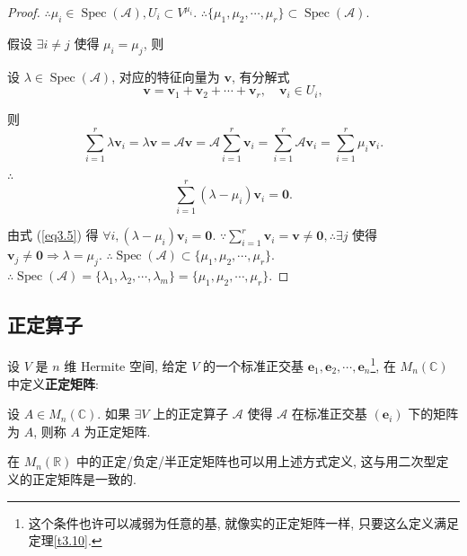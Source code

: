 \documentclass{ctexart}
\begin{document}
\begin{proof}
    $\therefore\mu_i\in\operatorname{Spec}(\mathcal{A}),U_i\subset V^{\mu_i}$. $\therefore\{\mu_1,\mu_2,\cdots,\mu_r\}\subset\operatorname{Spec}(\mathcal{A})$.

    假设 $\exists i\neq j$ 使得 $\mu_i=\mu_j$, 则 

    设 $\lambda\in\operatorname{Spec}(\mathcal{A})$, 对应的特征向量为 $\boldsymbol{v}$, 有分解式
    \[\boldsymbol{v}=\boldsymbol{v}_1+\boldsymbol{v}_2+\cdots+\boldsymbol{v}_r,\quad\boldsymbol{v}_i\in U_i,\]

    则
    \[\sum\limits_{i=1}^r\lambda\boldsymbol{v}_i=\lambda\boldsymbol{v}=\mathcal{A}\boldsymbol{v}=\mathcal{A}\sum\limits_{i=1}^r\boldsymbol{v}_i=\sum\limits_{i=1}^r\mathcal{A}\boldsymbol{v}_i=\sum\limits_{i=1}^r\mu_i\boldsymbol{v}_i.\]

    $\therefore$
    \[\sum\limits_{i=1}^r(\lambda-\mu_i)\boldsymbol{v}_i=\boldsymbol{0}.\]

    由式 (\ref{eq3.5}) 得 $\forall i,(\lambda-\mu_i)\boldsymbol{v}_i=\boldsymbol{0}$. $\because\sum\limits_{i=1}^r\boldsymbol{v}_i=\boldsymbol{v}\neq\boldsymbol{0},\therefore\exists j$ 使得 $\boldsymbol{v}_j\neq\boldsymbol{0}\Rightarrow\lambda=\mu_j$. $\therefore\operatorname{Spec}(\mathcal{A})\subset\{\mu_1,\mu_2,\cdots,\mu_r\}$. $\therefore\operatorname{Spec}(\mathcal{A})=\{\lambda_1,\lambda_2,\cdots,\lambda_m\}=\{\mu_1,\mu_2,\cdots,\mu_r\}$.

\end{proof}
\subsection{正定算子}
设 $V$ 是 $n$ 维 Hermite 空间, 给定 $V$ 的一个标准正交基 $\boldsymbol{e}_1,\boldsymbol{e}_2,\cdots,\boldsymbol{e}_n$\footnote{这个条件也许可以减弱为任意的基, 就像实的正定矩阵一样, 只要这么定义满足定理\ref{t3.10}.}, 在 $M_n(\mathbb{C})$ 中定义\textbf{正定矩阵}:
\begin{definition}\label{d3.2}
    设 $A\in M_n(\mathbb{C})$. 如果 $\exists V$ 上的正定算子 $\mathcal{A}$ 使得 $\mathcal{A}$ 在标准正交基 $(\boldsymbol{e}_i)$ 下的矩阵为 $A$, 则称 $A$ 为正定矩阵.
\end{definition}
在 $M_n(\mathbb{R})$ 中的正定/负定/半正定矩阵也可以用上述方式定义, 这与用二次型定义的正定矩阵是一致的.
\end{document}
